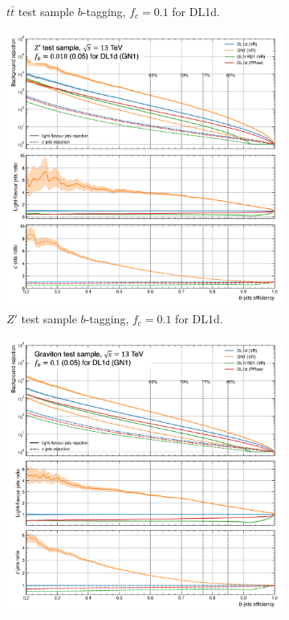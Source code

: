 \begin{figure}
\begin{subfigure}[t]{0.3\textwidth}
    \caption{$t\bar{t}$ test sample $b$-tagging, $f_c = 0.1$ for DL1d.}
    \label{fig:dl1dVRROCttc}
  \end{subfigure}
  \hfill
  \begin{subfigure}[t]{0.3\textwidth}
    \centering
    \includegraphics[scale=0.43]{Images/FTAG/VRDL1d/ROC/zpbupf.png}
    \caption{$Z'$ test sample $b$-tagging, $f_c = 0.1$ for DL1d.}
    \label{fig:dl1dVRROCzpc}
  \end{subfigure}
  \hfill
  \begin{subfigure}[t]{0.3\textwidth}
    \centering
    \includegraphics[scale=0.43]{Images/FTAG/VRDL1d/ROC/grbupf.png}

\end{subfigure}
\end{figure}
